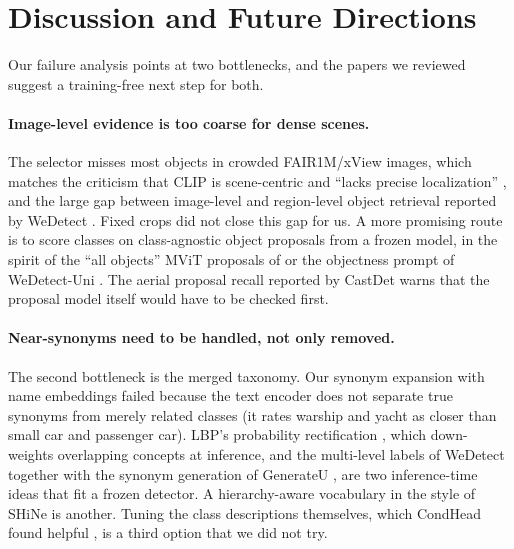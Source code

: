 \section{Discussion and Future Directions}
\label{sec:discussion}
Our failure analysis points at two bottlenecks, and the papers we reviewed suggest a training-free next step for both.

\paragraph{Image-level evidence is too coarse for dense scenes.}
The selector misses most objects in crowded FAIR1M/xView images, which matches the criticism that CLIP is scene-centric and ``lacks precise localization'' \cite{rasheed2022bridging}, and the large gap between image-level and region-level object retrieval reported by WeDetect \cite{fu2026wedetect}.
Fixed crops did not close this gap for us.
A more promising route is to score classes on class-agnostic object proposals from a frozen model, in the spirit of the ``all objects'' MViT proposals of \cite{rasheed2022bridging} or the objectness prompt of WeDetect-Uni \cite{fu2026wedetect}.
The aerial proposal recall reported by CastDet \cite{li2024castdet} warns that the proposal model itself would have to be checked first.

\paragraph{Near-synonyms need to be handled, not only removed.}
The second bottleneck is the merged taxonomy.
Our synonym expansion with name embeddings failed because the text encoder does not separate true synonyms from merely related classes (\eg it rates warship and yacht as closer than small car and passenger car).
LBP's probability rectification \cite{li2024lbp}, which down-weights overlapping concepts at inference, and the multi-level labels of WeDetect together with the synonym generation of GenerateU \cite{fu2026wedetect,lin2024generateu}, are two inference-time ideas that fit a frozen detector.
A hierarchy-aware vocabulary in the style of SHiNe \cite{liu2024shine} is another.
Tuning the class descriptions themselves, which CondHead found helpful \cite{wang2023condhead}, is a third option that we did not try.

